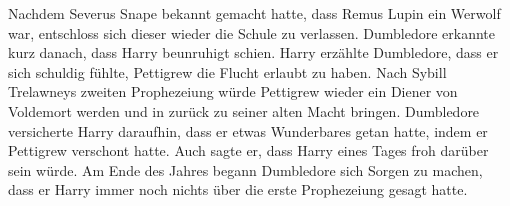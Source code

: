 \documentclass[a4paper, 10pt]{article}
\begin{document}
\newline
Nachdem Severus Snape bekannt gemacht hatte, dass Remus Lupin ein Werwolf war, entschloss sich dieser wieder die Schule zu verlassen. Dumbledore erkannte kurz danach, dass Harry beunruhigt schien. Harry erzählte Dumbledore, dass er sich schuldig fühlte, Pettigrew die Flucht erlaubt zu haben. Nach Sybill Trelawneys zweiten Prophezeiung würde Pettigrew wieder ein Diener von Voldemort werden und in zurück zu seiner alten Macht bringen. Dumbledore versicherte Harry daraufhin, dass er etwas Wunderbares getan hatte, indem er Pettigrew verschont hatte. Auch sagte er, dass Harry eines Tages froh darüber sein würde.
\vspace{10pt}
\newline
Am Ende des Jahres begann Dumbledore sich Sorgen zu machen, dass er Harry immer noch nichts über die erste Prophezeiung gesagt hatte.
\end{document}
